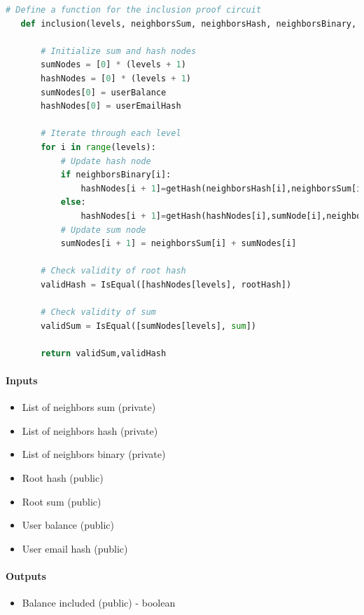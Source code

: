 \begin{lstlisting}[language=Python, caption=Inclusion circuit pseudocode]
   # Define a function for the inclusion proof circuit
   def inclusion(levels, neighborsSum, neighborsHash, neighborsBinary, step_in, sum, rootHash, userBalance, userEmailHash):
   
       # Initialize sum and hash nodes
       sumNodes = [0] * (levels + 1)
       hashNodes = [0] * (levels + 1)
       sumNodes[0] = userBalance
       hashNodes[0] = userEmailHash
   
       # Iterate through each level
       for i in range(levels):
           # Update hash node
           if neighborsBinary[i]:
               hashNodes[i + 1]=getHash(neighborsHash[i],neighborsSum[i],hashNodes[i],sumNode[i])
           else:
               hashNodes[i + 1]=getHash(hashNodes[i],sumNode[i],neighborsHash[i],neighborsSum[i])
           # Update sum node
           sumNodes[i + 1] = neighborsSum[i] + sumNodes[i]
   
       # Check validity of root hash
       validHash = IsEqual([hashNodes[levels], rootHash])
   
       # Check validity of sum
       validSum = IsEqual([sumNodes[levels], sum])
   
       return validSum,validHash
\end{lstlisting}


\paragraph{Inputs}
\begin{itemize}
   \item List of neighbors sum (private)
   \item List of neighbors hash (private)
   \item List of neighbors binary (private)
   \item Root hash (public)
   \item Root sum (public)
   \item User balance (public)
   \item User email hash (public)
   \end{itemize}


\paragraph{Outputs}
\begin{itemize}
   \item Balance included (public) - boolean
   \end{itemize}


